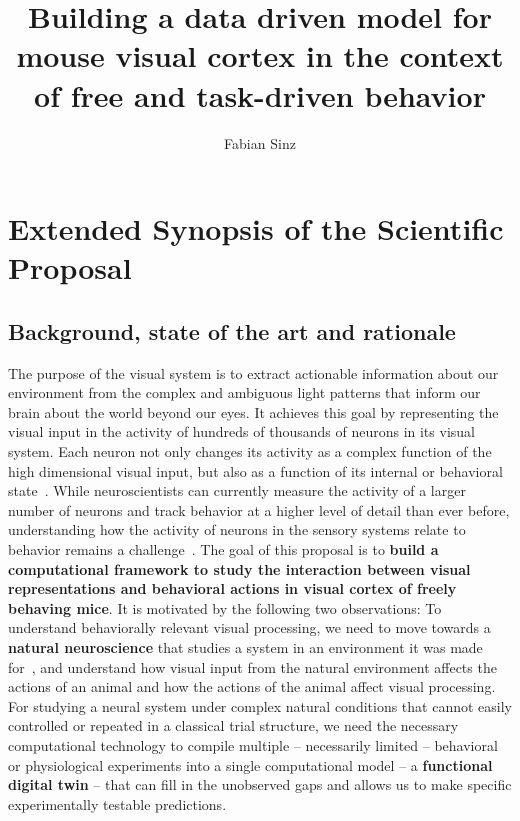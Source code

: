 \documentclass[COG,11pt]{ercgrant}
\author{Fabian Sinz}
\title{Building a data driven model for mouse visual cortex in the context of free and task-driven behavior}
\begin{document}
\maketitle

\begin{abstract}
	\textcolor{red}{
		
	}
\end{abstract}



\section{Extended Synopsis of the Scientific Proposal}

\subsection{Background, state of the art and rationale}
The purpose of the visual system is to extract actionable information about our environment from the complex and ambiguous light patterns that inform our brain about the world beyond our eyes. 
It achieves this goal by representing the visual input in the activity of hundreds of thousands of neurons in its visual system.
Each neuron not only changes its activity as a complex function of the high dimensional visual input, but also as a function of its internal or behavioral state~\parencite{Niell2010-bs, Musall2019-kd, Erisken2014-un,Christensen2017-bx}. 
While neuroscientists can currently measure the activity of a larger number of neurons and track behavior at a higher level of detail than ever before, understanding how the activity of neurons in the sensory systems relate to behavior remains a challenge~\parencite{Urai2022-fz}.
The goal of this proposal is to \textbf{build a computational framework to study the interaction between visual representations and behavioral actions in visual cortex of freely behaving mice}. 
It is motivated by the following two observations: 
 To understand behaviorally relevant visual processing, we need to move towards a \textbf{natural neuroscience} that studies a system in an environment it was made for~\parencite{Huk2018-ez, Datta2019-qj}, and understand how visual input from the natural environment affects the actions of an animal and how the actions of the animal affect visual processing. 
 For studying a neural system under complex natural conditions that cannot easily controlled or repeated in a classical trial structure, we need the necessary computational technology to compile multiple -- necessarily limited -- behavioral or physiological experiments into a single computational model -- a \textbf{functional digital twin} -- that can fill in the unobserved gaps and allows us to make specific experimentally testable predictions.
\end{document}
